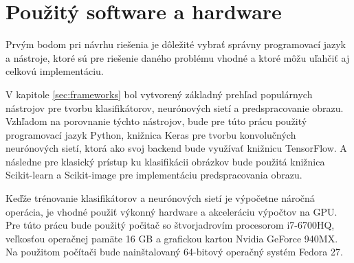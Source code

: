 
\section{Použitý software a hardware}
\label{sec:softwarehardware}
Prvým bodom pri návrhu riešenia je dôležité vybrať správny programovací jazyk a nástroje, ktoré sú pre riešenie daného problému vhodné
    a ktoré môžu uľahčiť aj celkovú implementáciu.

V kapitole \ref{sec:frameworks} bol vytvorený základný prehľad populárnych nástrojov pre tvorbu klasifikátorov, neurónových sietí a predspracovanie obrazu.
Vzhľadom na porovnanie týchto nástrojov, bude pre túto prácu použitý programovací jazyk Python, knižnica Keras pre tvorbu konvolučných neurónových sietí, ktorá
    ako svoj backend bude využívať knižnicu TensorFlow.
A následne pre klasický prístup ku klasifikácii obrázkov bude použitá knižnica Scikit-learn a Scikit-image pre implementáciu predspracovania obrazu.

Keďže trénovanie klasifikátorov a neurónových sietí je výpočetne náročná operácia, je vhodné použiť výkonný hardware a akceleráciu výpočtov na GPU.
Pre túto prácu bude použitý počitač so štvorjadrovím procesorom i7-6700HQ, veľkosťou operačnej pamäte 16 GB a grafickou kartou Nvidia GeForce 940MX.
Na použitom počítači bude nainštalovaný 64-bitový operačný systém Fedora 27.
